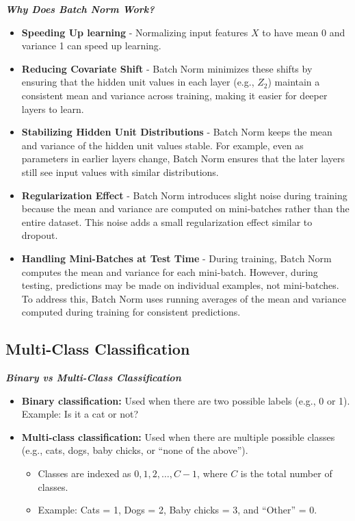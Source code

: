 \documentclass[letterpaper,12pt,notitlepage,twoside]{report}
\begin{document}
\textit{\textbf{Why Does Batch Norm Work?}} 
\begin{itemize}[noitemsep, topsep=0pt]
    \item \textbf{Speeding Up learning} - Normalizing input features \( X \) to have mean 0 and variance 1 can speed up learning.
    \item \textbf{Reducing Covariate Shift} - Batch Norm minimizes these shifts by ensuring that the hidden unit values in each layer (e.g., \(Z_2\)) maintain a consistent mean and variance across training, making it easier for deeper layers to learn.
    \item \textbf{Stabilizing Hidden Unit Distributions} - Batch Norm keeps the mean and variance of the hidden unit values stable. For example, even as parameters in earlier layers change, Batch Norm ensures that the later layers still see input values with similar distributions.
    \item \textbf{Regularization Effect} - Batch Norm introduces slight noise during training because the mean and variance are computed on mini-batches rather than the entire dataset. This noise adds a small regularization effect similar to dropout.
    \item \textbf{Handling Mini-Batches at Test Time} - During training, Batch Norm computes the mean and variance for each mini-batch. However, during testing, predictions may be made on individual examples, not mini-batches. To address this, Batch Norm uses running averages of the mean and variance computed during training for consistent predictions.
\end{itemize}

\subsection{Multi-Class Classification}
\textit{\textbf{Binary vs Multi-Class Classification}}
\begin{itemize}[noitemsep, topsep=0pt]
    \item \textbf{Binary classification:} Used when there are two possible labels (e.g., 0 or 1). Example: Is it a cat or not?
    \item \textbf{Multi-class classification:} Used when there are multiple possible classes (e.g., cats, dogs, baby chicks, or ``none of the above'').
    \begin{itemize}
        \item Classes are indexed as $0, 1, 2, \ldots, C-1$, where $C$ is the total number of classes.
        \item Example: Cats = 1, Dogs = 2, Baby chicks = 3, and ``Other'' = 0.
    \end{itemize}
\end{itemize}
\end{document}
